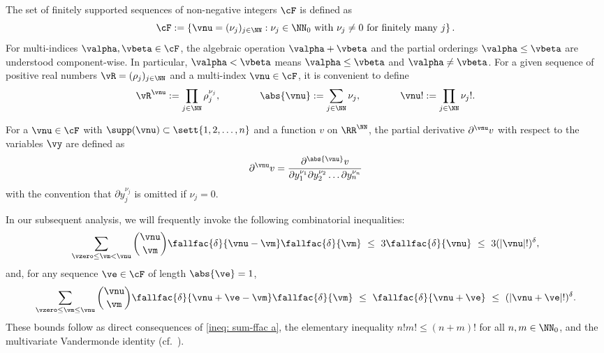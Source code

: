 The set of finitely supported sequences of non-negative integers $\cF$ is defined as
\begin{equation}\label{cF-def}
	\cF := 
	\left\{
	\vnu ={(\nu_j)_{j \in \NN}} : \nu_j\in \NN_0 \text{ with } \nu_j \neq 0 \text{ for  finitely many } j
	\right\}.
\end{equation}
For multi-indices $\valpha, \vbeta \in \cF$, the algebraic operation $\valpha + \vbeta$ and the partial orderings $\valpha \leq \vbeta$ are understood component-wise. In particular, $\valpha < \vbeta$ means $\valpha \leq \vbeta$ and $\valpha \neq \vbeta$. For a given sequence of positive real numbers $\vR=(\rho_j)_{j{\in \NN}}$ and a multi-index $\vnu \in \cF$, it is convenient to define
\begin{align*}
	\vR^{\vnu} := \prod_{j{\in \NN}} \rho_j^{\nu_j},
	\qquad \qquad
	\abs{\vnu} := \sum_{j{\in \NN}} \nu_j, 
	\qquad \qquad
	\vnu! := \prod_{j{\in \NN}} \nu_j!. 
\end{align*}


For a $\vnu\in \cF$ with  $\supp (\vnu) \subset\sett{1,2,\dots, n}$ and a function $v$ on $\RR^\NN$, the partial derivative $\partial^{\vnu} v$ with respect to the variables $\vy$ are defined as
\begin{align*}
	\partial^{\vnu} v
	=
	\frac{\partial^{\abs{\vnu}}v}
	{\partial y_1^{\nu_1} \partial y_2^{\nu_2} \dots \partial y_n^{\nu_n}}
\end{align*}
with the convention that $\partial y_j^{\nu_j}$ is omitted if $\nu_j =0$. 

In our subsequent analysis, we will frequently invoke the following combinatorial inequalities:
\begin{equation} \label{frac{1}{4}...}	
	\sum_{{\vzero \le \vm < \vnu}} \binom{\vnu}{\vm}\fallfac{\delta}{{\vnu-\vm}}\fallfac{\delta}{{\vm}}
	\  \le \
	3\fallfac{\delta}{{\vnu}}
	\ \le \ 	
	3(|\vnu|!)^\delta,		
\end{equation}	
and, for any sequence $\ve \in \cF$ of length $\abs{\ve}=1$,
\begin{equation} \label{fall_fac_ineq}	
	\sum_{{\vzero \leq}\vm \le \vnu} \binom{\vnu}{\vm}\fallfac{\delta}{{\vnu+\ve-\vm}}\fallfac{\delta}{{\vm}}
	\  \le \
	\fallfac{\delta}{{\vnu+\ve}}
	\ \le \ 	
	(|\vnu+\ve|!)^\delta.		
\end{equation}	
These bounds follow as direct consequences of \eqref{ineq: sum-ffac a}, the elementary inequality $n!m!\leq (n+m)!$ for all $n,m\in \NN_0$, and the multivariate Vandermonde identity (cf.\ \cite[Lemma 7.1]{CL2024}).

